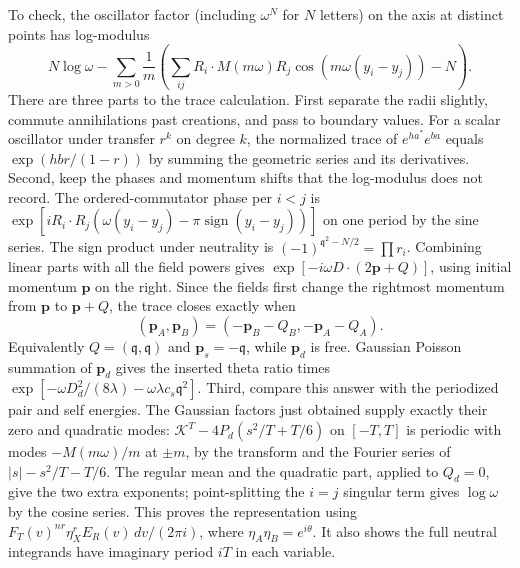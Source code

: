 To check, the oscillator factor (including \(\omega^N\) for \(N\) letters) on the axis at distinct points has log-modulus
\begin{equation}
 N\log\omega-\sum_{m>0}\frac1m\left(
 \sum_{ij}R_i\cdot M(m\omega) R_j\cos(m\omega(y_i-y_j))-N\right).       \label{c2:eq-V2}
\end{equation}
There are three parts to the trace calculation. First separate the
radii slightly, commute annihilations past creations, and pass to boundary
values. For a scalar oscillator under transfer \(r^k\) on degree \(k\), the normalized trace of \(e^{h a^*}e^{b a}\) equals \(\exp(hb r/(1-r))\) by summing the geometric series and its derivatives. Second, keep the phases and momentum shifts that the log-modulus does
not record. The ordered-commutator phase per \(i<j\) is \(\exp[i R_i\cdot R_j(\omega(y_i-y_j)-\pi\operatorname{sign}(y_i-y_j))]\) on one period by the sine series. The sign product under neutrality is \((-1)^{\mathfrak q^2-N/2}=\prod r_i\). Combining linear parts with all the field powers gives \(\exp[-i\omega D\cdot(2\mathbf p+Q)]\), using initial momentum \(\mathbf p\) on the right. Since the fields first change the rightmost momentum from
\(\mathbf p\) to \(\mathbf p+Q\), the trace closes exactly when
\[
 (\mathbf p_A,\mathbf p_B)
 =(-\mathbf p_B-Q_B,-\mathbf p_A-Q_A).
\]
Equivalently \(Q=(\mathfrak q,\mathfrak q)\) and
\(\mathbf p_s=-\mathfrak q\), while \(\mathbf p_d\) is free.
Gaussian Poisson summation of \(\mathbf p_d\) gives the inserted theta ratio times \(\exp[-\omega D_d^2/(8\lambda)-\omega\lambda c_s \mathfrak q^2]\). Third, compare this answer with the periodized pair and self energies.
The Gaussian factors just obtained supply exactly their zero and
quadratic modes: \(\mathcal K^T-4P_d(s^2/T+T/6)\) on \([-T,T]\) is periodic with modes \(-M(m\omega)/m\) at \(\pm m\), by the transform and the Fourier series of \(|s|-s^2/T-T/6\). The regular mean and the quadratic part, applied to \(Q_d=0\), give the two extra exponents; point-splitting the \(i=j\) singular term gives \(\log\omega\) by the cosine series. This proves the representation using \(F_T(v)^{nr}\eta_X^r E_R(v)\,dv/(2\pi i)\), where \(\eta_A\eta_B=e^{i\theta}\). It also shows the full neutral integrands have imaginary period \(iT\) in each variable.

